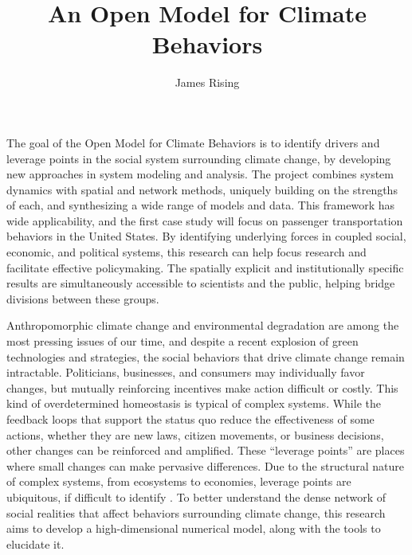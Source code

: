 \documentclass[12pt, oneside]{amsart}
\title{An Open Model for Climate Behaviors}
\author{James Rising}
\begin{document}
\maketitle


The goal of the Open Model for Climate Behaviors is to identify drivers and leverage points in the social system surrounding climate change, by developing new approaches in system modeling and analysis.  The project combines system dynamics with spatial and network methods, uniquely building on the strengths of each, and synthesizing a wide range of models and data.  This framework has wide applicability, and the first case study will focus on passenger transportation behaviors in the United States.  By identifying underlying forces in coupled social, economic, and political systems, this research can help focus research and facilitate effective policymaking.  The spatially explicit and institutionally specific results are simultaneously accessible to scientists and the public, helping bridge divisions between these groups.

Anthropomorphic climate change and environmental degradation are among the most pressing issues of our time, and despite a recent explosion of green technologies and strategies, the social behaviors that drive climate change remain intractable.  Politicians, businesses, and consumers may individually favor changes, but mutually reinforcing incentives make action difficult or costly.  This kind of overdetermined homeostasis is typical of complex systems.  While the feedback loops that support the status quo reduce the effectiveness of some actions, whether they are new laws, citizen movements, or business decisions, other changes can be reinforced and amplified.  These ``leverage points'' are places where small changes can make pervasive differences.  Due to the structural nature of complex systems, from ecosystems to economies, leverage points are ubiquitous, if difficult to identify \citep{meadows1997places}.  To better understand the dense network of social realities that affect behaviors surrounding climate change, this research aims to develop a high-dimensional numerical model, along with the tools to elucidate it.
\end{document}
